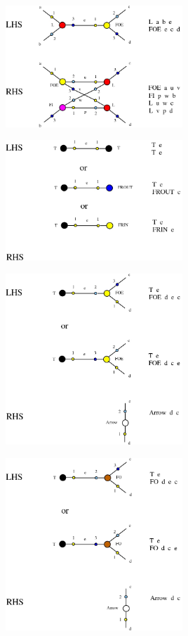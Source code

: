 \documentclass{article}
\begin{document}
\centerline{\includegraphics[width=0.5\textwidth]{../img/L-FOE.jpg}
}
\vspace{.5cm}


\vspace{.5cm}
 
\centerline{\includegraphics[width=0.5\textwidth]{../img/remove4-T-T.jpg}
}
\vspace{.5cm}


\centerline{\includegraphics[width=0.5\textwidth]{../img/term1-FOE-T.jpg}
}
\vspace{.5cm}

\vspace{.5cm}
 
\centerline{\includegraphics[width=0.5\textwidth]{../img/term1-FO-T.jpg}
}
\vspace{.5cm}
\end{document}
